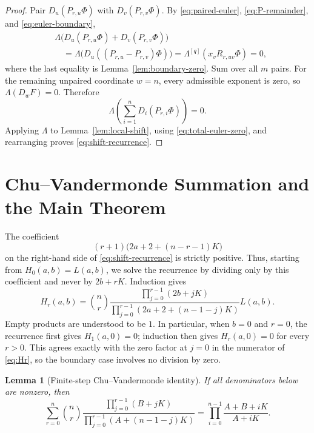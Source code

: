 \documentclass[11pt,a4paper]{article}
\newtheorem{lemma}[theorem]{Lemma}
\theoremstyle{definition}
\begin{document}
\begin{proof}
Pair $D_u(P_{r,u}\Phi)$ with $D_v(P_{r,v}\Phi)$.  By
\eqref{eq:paired-euler}, \eqref{eq:P-remainder}, and
\eqref{eq:euler-boundary},
\[
\begin{aligned}
&\Lambda\bigl(D_u(P_{r,u}\Phi)+D_v(P_{r,v}\Phi)\bigr)\\
&\quad=\Lambda\bigl(D_u((P_{r,u}-P_{r,v})\Phi)\bigr)
=\Lambda^{[q]}(x_vR_{r,uv}\Phi)=0,
\end{aligned}
\]
where the last equality is Lemma~\ref{lem:boundary-zero}.  Sum over all
$m$ pairs.  For the remaining unpaired coordinate $w=n$, every
admissible exponent is zero, so $\Lambda(D_wF)=0$.  Therefore
\begin{equation}\label{eq:total-euler-zero}
\Lambda\left(\sum_{i=1}^{n}D_i(P_{r,i}\Phi)\right)=0.
\end{equation}
Applying $\Lambda$ to Lemma~\ref{lem:local-shift}, using
\eqref{eq:total-euler-zero}, and rearranging proves
\eqref{eq:shift-recurrence}.
\end{proof}

\section{Chu--Vandermonde Summation and the Main Theorem}

The coefficient
\[
(r+1)\bigl(2a+2+(n-r-1)K\bigr)
\]
on the right-hand side of \eqref{eq:shift-recurrence} is strictly
positive.  Thus, starting from $H_0(a,b)=L(a,b)$, we solve the
recurrence by dividing only by this coefficient and never by
$2b+rK$.  Induction gives
\begin{equation}\label{eq:Hr}
H_r(a,b)=\binom nr
\frac{\prod_{j=0}^{r-1}(2b+jK)}
{\prod_{j=0}^{r-1}(2a+2+(n-1-j)K)}
L(a,b).
\end{equation}
Empty products are understood to be $1$.  In particular, when $b=0$
and $r=0$, the recurrence first gives $H_1(a,0)=0$; induction then
gives $H_r(a,0)=0$ for every $r>0$.  This agrees exactly with the zero
factor at $j=0$ in the numerator of \eqref{eq:Hr}, so the boundary case
involves no division by zero.

\begin{lemma}[Finite-step Chu--Vandermonde identity]\label{lem:vandermonde}
If all denominators below are nonzero, then
\begin{equation}\label{eq:vandermonde-ratio}
\sum_{r=0}^{n}\binom nr
\frac{\prod_{j=0}^{r-1}(B+jK)}
{\prod_{j=0}^{r-1}(A+(n-1-j)K)}
=\prod_{i=0}^{n-1}\frac{A+B+iK}{A+iK}.
\end{equation}
\end{lemma}
\end{document}

